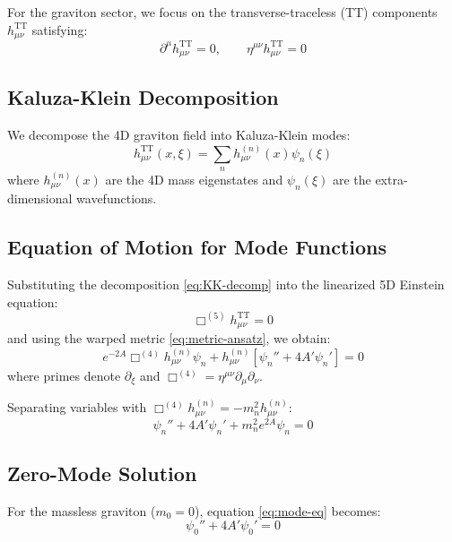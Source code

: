 \documentclass[11pt,a4paper]{article}
\begin{document}
For the graviton sector, we focus on the transverse-traceless (TT) components
$h_{\mu\nu}^{\mathrm{TT}}$ satisfying:
\begin{equation}
\partial^\mu h_{\mu\nu}^{\mathrm{TT}} = 0, \qquad
\eta^{\mu\nu} h_{\mu\nu}^{\mathrm{TT}} = 0
\label{eq:TT-gauge}
\end{equation}

\subsection{Kaluza-Klein Decomposition}

We decompose the 4D graviton field into Kaluza-Klein modes:
\begin{equation}
h_{\mu\nu}^{\mathrm{TT}}(x,\xi) = \sum_n h_{\mu\nu}^{(n)}(x) \psi_n(\xi)
\label{eq:KK-decomp}
\end{equation}
where $h_{\mu\nu}^{(n)}(x)$ are the 4D mass eigenstates and $\psi_n(\xi)$ are
the extra-dimensional wavefunctions.

\subsection{Equation of Motion for Mode Functions}

Substituting the decomposition \eqref{eq:KK-decomp} into the linearized 5D
Einstein equation:
\begin{equation}
\Box^{(5)} h_{\mu\nu}^{\mathrm{TT}} = 0
\label{eq:5D-eom}
\end{equation}
and using the warped metric \eqref{eq:metric-ansatz}, we obtain:
\begin{equation}
e^{-2A} \Box^{(4)} h_{\mu\nu}^{(n)} \psi_n
+ h_{\mu\nu}^{(n)} \left[ \psi_n'' + 4A'\psi_n' \right] = 0
\label{eq:separation}
\end{equation}
where primes denote $\partial_\xi$ and $\Box^{(4)} = \eta^{\mu\nu}\partial_\mu\partial_\nu$.

Separating variables with $\Box^{(4)} h_{\mu\nu}^{(n)} = -m_n^2 h_{\mu\nu}^{(n)}$:
\begin{equation}
\psi_n'' + 4A'\psi_n' + m_n^2 e^{2A} \psi_n = 0
\label{eq:mode-eq}
\end{equation}

\subsection{Zero-Mode Solution}

For the massless graviton ($m_0 = 0$), equation \eqref{eq:mode-eq} becomes:
\begin{equation}
\psi_0'' + 4A'\psi_0' = 0
\label{eq:zero-mode-eq}
\end{equation}
\end{document}
